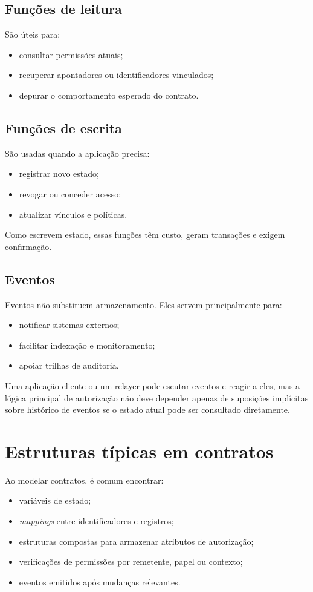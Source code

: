 \subsection{Funções de leitura}
São úteis para:
\begin{itemize}[leftmargin=*]
  \item consultar permissões atuais;
  \item recuperar apontadores ou identificadores vinculados;
  \item depurar o comportamento esperado do contrato.
\end{itemize}

\subsection{Funções de escrita}
São usadas quando a aplicação precisa:
\begin{itemize}[leftmargin=*]
  \item registrar novo estado;
  \item revogar ou conceder acesso;
  \item atualizar vínculos e políticas.
\end{itemize}

Como escrevem estado, essas funções têm custo, geram transações e exigem confirmação.

\subsection{Eventos}
Eventos não substituem armazenamento. Eles servem principalmente para:
\begin{itemize}[leftmargin=*]
  \item notificar sistemas externos;
  \item facilitar indexação e monitoramento;
  \item apoiar trilhas de auditoria.
\end{itemize}

Uma aplicação cliente ou um relayer pode escutar eventos e reagir a eles, mas a lógica principal de autorização não deve depender apenas de suposições implícitas sobre histórico de eventos se o estado atual pode ser consultado diretamente.

\section{Estruturas típicas em contratos}
Ao modelar contratos, é comum encontrar:
\begin{itemize}[leftmargin=*]
  \item variáveis de estado;
  \item \textit{mappings} entre identificadores e registros;
  \item estruturas compostas para armazenar atributos de autorização;
  \item verificações de permissões por remetente, papel ou contexto;
  \item eventos emitidos após mudanças relevantes.
\end{itemize}

